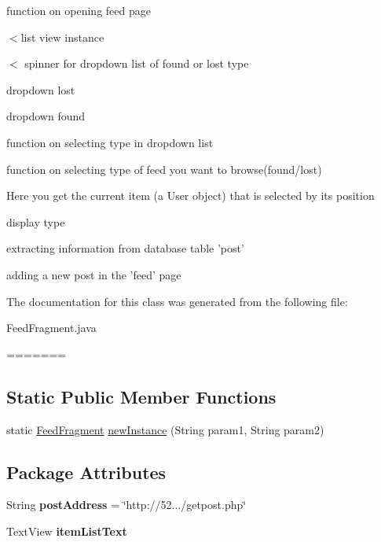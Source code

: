 \begin{DoxyCompactItemize}
function on opening feed page 

$<$list view instance

$<$ spinner for dropdown list of found or lost type

dropdown lost

dropdown found

function on selecting type in dropdown list

function on selecting type of feed you want to browse(found/lost)

Here you get the current item (a User object) that is selected by its position

display type

extracting information from database table 'post'

adding a new post in the 'feed' page 

The documentation for this class was generated from the following file\-:\begin{DoxyCompactItemize}
\item 
Feed\-Fragment.\-java\end{DoxyCompactItemize}
=======
\subsection*{\-Static \-Public \-Member \-Functions}
\begin{DoxyCompactItemize}
\item 
static \hyperlink{classcom_1_1example_1_1sel_1_1lostfound_1_1FeedFragment}{\-Feed\-Fragment} \hyperlink{classcom_1_1example_1_1sel_1_1lostfound_1_1FeedFragment_a63f279103cc59000c74087d6addb351f}{new\-Instance} (\-String param1, \-String param2)
\end{DoxyCompactItemize}
\subsection*{\-Package \-Attributes}
\begin{DoxyCompactItemize}
\item 
\hypertarget{classcom_1_1example_1_1sel_1_1lostfound_1_1FeedFragment_a93e4b49c719547b375ae827d67d59b7e}{\-String {\bfseries post\-Address} = \char`\"{}http\-://52.../getpost.\-php\char`\"{}}\label{classcom_1_1example_1_1sel_1_1lostfound_1_1FeedFragment_a93e4b49c719547b375ae827d67d59b7e}

\item 
\hypertarget{classcom_1_1example_1_1sel_1_1lostfound_1_1FeedFragment_ac53cb6f2e134f986b2854dd1e52db04a}{\-Text\-View {\bfseries item\-List\-Text}}\label{classcom_1_1example_1_1sel_1_1lostfound_1_1FeedFragment_ac53cb6f2e134f986b2854dd1e52db04a}


\end{DoxyCompactItemize}
\end{DoxyCompactItemize}
